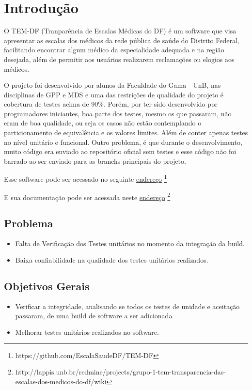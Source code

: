 \chapter[Introdução]{Introdução}

O TEM-DF (Tranparência de Escalas Médicas do DF) é um software que visa apresentar as escalas dos médicos da rede pública de saúde do Distrito Federal, facilitando encontrar algum médico da especialidade adequada e na região desejada, além de permitir aos usuários realizarem reclamações ou elogios aos médicos.


O projeto foi desenvolvido por alunos da Faculdade do Gama - UnB, nas disciplinas de GPP e MDS e uma das restrições de qualidade do projeto é cobertura de testes acima de 90\%. Porém, por ter sido desenvolvido por programadores iniciantes, boa parte dos testes, mesmo os que passaram, não eram de boa qualidade, ou seja os casos não estão contemplando o particionamento de equivalência e os valores limites. Além de conter apenas testes no nível unitário e funcional. Outro problema, é que durante o desenvolvimento, muito código era enviado ao repositório oficial sem testes e esse código não foi barrado ao ser enviado para as branchs principais do projeto.


Esse software pode ser acessado no seguinte \href{https://github.com/EscalaSaudeDF/TEM-DF}{endereço}%
\footnote{https://github.com/EscalaSaudeDF/TEM-DF}

E sua documentação pode ser acessada neste \href{http://lappis.unb.br/redmine/projects/grupo-1-tem-transparencia-das-escalas-dos-medicos-do-df/wiki}{endereço}%
\footnote{http://lappis.unb.br/redmine/projects/grupo-1-tem-transparencia-das-escalas-dos-medicos-do-df/wiki}


\section{Problema}
\begin{itemize}
\item Falta de Verificação dos Testes unitários no momento da integração da build.
\item Baixa confiabilidade na qualidade dos testes unitários realizados.
\end{itemize}

\section{Objetivos Gerais }
\begin{itemize}
    \item Verificar a integridade, analisando se todos os testes de unidade e aceitação passaram, de uma build de software a ser adicionada
    \item Melhorar testes unitários realizados no software.
\end{itemize}

